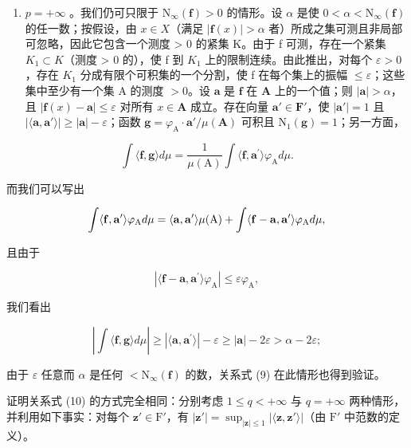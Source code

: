 \begin{enumerate}
\def\labelenumi{(\roman{enumi})}
\setcounter{enumi}{1}
\tightlist
\item
  \(p = +\infty\) 。我们仍可只限于 \(\mathrm{N}_{\infty}(\mathbf{f}) > 0\) 的情形。设 \(\alpha\) 是使 \(0 < \alpha < \mathrm{N}_{\infty}(\mathbf{f})\) 的任一数；按假设，由 \(x \in X\)（满足 \(|\mathbf{f}(x)| > \alpha\) 者）所成之集可测且非局部可忽略，因此它包含一个测度 \textgreater{} 0 的紧集 K。由于 f 可测，存在一个紧集 \(K_{1} \subset K\)（测度 \textgreater{} 0 的），使 f 到 \(K_{1}\) 上的限制连续。由此推出，对每个 \(\varepsilon > 0\)，存在 \(K_{1}\) 分成有限个可积集的一个分割，使 f 在每个集上的振幅 \(\leqslant \varepsilon\)；这些集中至少有一个集 A 的测度 \(>0\)。设 \(\mathbf{a}\) 是 \(\mathbf{f}\) 在 \(\mathbf{A}\) 上的一个值；则 \(|\mathbf{a}| > \alpha\)，且 \(|\mathbf{f}(x) - \mathbf{a}| \leqslant \varepsilon\) 对所有 \(x \in \mathbf{A}\) 成立。存在向量 \(\mathbf{a}' \in \mathbf{F}'\)，使 \(|\mathbf{a}'| = 1\) 且 \(|\langle \mathbf{a}, \mathbf{a}' \rangle| \geqslant |\mathbf{a}| - \varepsilon\)；函数 \(\mathbf{g} = \varphi_{\mathrm{A}} \cdot \mathbf{a}' / \mu(\mathbf{A})\) 可积且 \(\mathrm{N}_1(\mathbf{g}) = 1\)；另一方面，
\end{enumerate}

\[
\int \langle \mathbf {f}, \mathbf {g} \rangle d \mu = \frac {1}{\mu (\mathrm{A})} \int \langle \mathbf {f}, \mathbf {a} ^ {\prime} \rangle \varphi_ {\mathrm{A}} d \mu .
\]

而我们可以写出

\[
\int \langle {\bf f}, {\bf a} ^ {\prime} \rangle \varphi_ {\mathrm{A}} d \mu = \langle {\bf a}, {\bf a} ^ {\prime} \rangle \mu (\mathrm{A}) + \int \langle {\bf f} - {\bf a}, {\bf a} ^ {\prime} \rangle \varphi_ {\mathrm{A}} d \mu ,
\]

且由于

\[
\left| \langle \mathbf {f} - \mathbf {a}, \mathbf {a} ^ {\prime} \rangle \varphi_ {\mathrm{A}} \right| \leqslant \varepsilon \varphi_ {\mathrm{A}},
\]

我们看出

\[
\left| \int \langle \mathbf {f}, \mathbf {g} \rangle d \mu \right| \geqslant | \langle \mathbf {a}, \mathbf {a} ^ {\prime} \rangle | - \varepsilon \geqslant | \mathbf {a} | - 2 \varepsilon > \alpha - 2 \varepsilon ;
\]

由于 \(\varepsilon\) 任意而 \(\alpha\) 是任何 \(<\mathrm{N}_{\infty}(\mathbf{f})\) 的数，关系式 (9) 在此情形也得到验证。

证明关系式 (10) 的方式完全相同：分别考虑 \(1 \leqslant q < +\infty\) 与 \(q = +\infty\) 两种情形，并利用如下事实：对每个 \(\mathbf{z}' \in \mathrm{F}'\)，有 \(|\mathbf{z}'| = \sup_{|\mathbf{z}| \leqslant 1} |\langle \mathbf{z}, \mathbf{z}' \rangle|\)（由 \(\mathrm{F}'\) 中范数的定义）。

